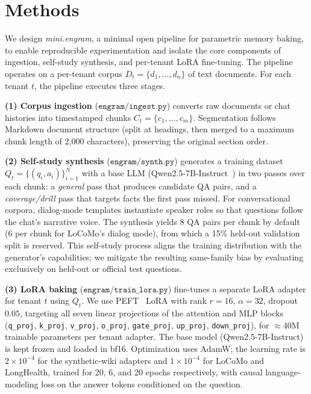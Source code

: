 \documentclass[conference]{IEEEtran}
\begin{document}
\section{Methods}
We design \textit{mini.engram}, a minimal open pipeline for parametric memory baking, to enable reproducible experimentation and isolate the core components of ingestion, self-study synthesis, and per-tenant LoRA fine-tuning. The pipeline operates on a per-tenant corpus $D_t = \{d_1, \dots, d_n\}$ of text documents. For each tenant $t$, the pipeline executes three stages.

\textbf{(1) Corpus ingestion} ($\texttt{engram/ingest.py}$) converts raw documents or chat histories into timestamped chunks $C_t = \{c_1, \dots, c_m\}$. Segmentation follows Markdown document structure (split at headings, then merged to a maximum chunk length of 2{,}000 characters), preserving the original section order.

\textbf{(2) Self-study synthesis} ($\texttt{engram/synth.py}$) generates a training dataset $Q_t = \{(q_i, a_i)\}_{i=1}^{N}$ with a base LLM (Qwen2.5-7B-Instruct~\cite{qwen2025}) in two passes over each chunk: a \textit{general} pass that produces candidate QA pairs, and a \textit{coverage/drill} pass that targets facts the first pass missed. For conversational corpora, dialog-mode templates instantiate speaker roles so that questions follow the chat's narrative voice. The synthesis yields 8 QA pairs per chunk by default (6 per chunk for LoCoMo's dialog mode), from which a 15\% held-out validation split is reserved. This self-study process aligns the training distribution with the generator's capabilities; we mitigate the resulting same-family bias by evaluating exclusively on held-out or official test questions.

\textbf{(3) LoRA baking} ($\texttt{engram/train\_lora.py}$) fine-tunes a separate LoRA adapter for tenant $t$ using $Q_t$. We use PEFT~\cite{lialin2023peft} LoRA with rank $r=16$, $\alpha = 32$, dropout $0.05$, targeting all seven linear projections of the attention and MLP blocks (\texttt{q\_proj}, \texttt{k\_proj}, \texttt{v\_proj}, \texttt{o\_proj}, \texttt{gate\_proj}, \texttt{up\_proj}, \texttt{down\_proj}), for $\approx 40$M trainable parameters per tenant adapter. The base model (Qwen2.5-7B-Instruct) is kept frozen and loaded in bf16. Optimization uses AdamW; the learning rate is $2 \times 10^{-4}$ for the synthetic-wiki adapters and $1 \times 10^{-4}$ for LoCoMo and LongHealth, trained for 20, 6, and 20 epochs respectively, with causal language-modeling loss on the answer tokens conditioned on the question.
\end{document}
